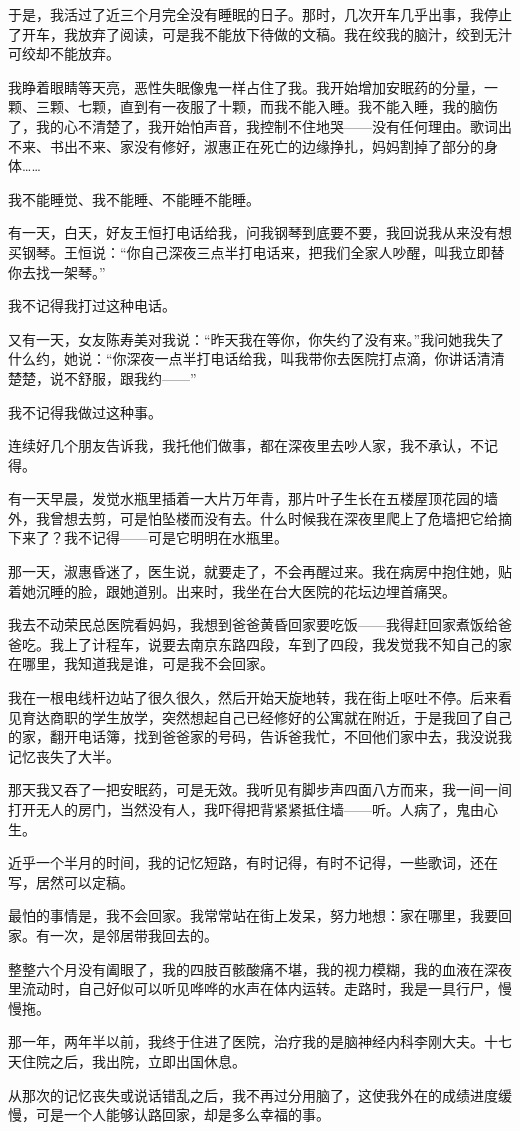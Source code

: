 \par 于是，我活过了近三个月完全没有睡眠的日子。那时，几次开车几乎出事，我停止了开车，我放弃了阅读，可是我不能放下待做的文稿。我在绞我的脑汁，绞到无汁可绞却不能放弃。
\par 我睁着眼睛等天亮，恶性失眠像鬼一样占住了我。我开始增加安眠药的分量，一颗、三颗、七颗，直到有一夜服了十颗，而我不能入睡。我不能入睡，我的脑伤了，我的心不清楚了，我开始怕声音，我控制不住地哭——没有任何理由。歌词出不来、书出不来、家没有修好，淑惠正在死亡的边缘挣扎，妈妈割掉了部分的身体……
\par 我不能睡觉、我不能睡、不能睡不能睡。
\par 有一天，白天，好友王恒打电话给我，问我钢琴到底要不要，我回说我从来没有想买钢琴。王恒说：“你自己深夜三点半打电话来，把我们全家人吵醒，叫我立即替你去找一架琴。”
\par 我不记得我打过这种电话。
\par 又有一天，女友陈寿美对我说：“昨天我在等你，你失约了没有来。”我问她我失了什么约，她说：“你深夜一点半打电话给我，叫我带你去医院打点滴，你讲话清清楚楚，说不舒服，跟我约——”
\par 我不记得我做过这种事。
\par 连续好几个朋友告诉我，我托他们做事，都在深夜里去吵人家，我不承认，不记得。
\par 有一天早晨，发觉水瓶里插着一大片万年青，那片叶子生长在五楼屋顶花园的墙外，我曾想去剪，可是怕坠楼而没有去。什么时候我在深夜里爬上了危墙把它给摘下来了？我不记得——可是它明明在水瓶里。
\par 那一天，淑惠昏迷了，医生说，就要走了，不会再醒过来。我在病房中抱住她，贴着她沉睡的脸，跟她道别。出来时，我坐在台大医院的花坛边埋首痛哭。
\par 我去不动荣民总医院看妈妈，我想到爸爸黄昏回家要吃饭——我得赶回家煮饭给爸爸吃。我上了计程车，说要去南京东路四段，车到了四段，我发觉我不知自己的家在哪里，我知道我是谁，可是我不会回家。
\par 我在一根电线杆边站了很久很久，然后开始天旋地转，我在街上呕吐不停。后来看见育达商职的学生放学，突然想起自己已经修好的公寓就在附近，于是我回了自己的家，翻开电话簿，找到爸爸家的号码，告诉爸我忙，不回他们家中去，我没说我记忆丧失了大半。
\par 那天我又吞了一把安眠药，可是无效。我听见有脚步声四面八方而来，我一间一间打开无人的房门，当然没有人，我吓得把背紧紧抵住墙——听。人病了，鬼由心生。
\par 近乎一个半月的时间，我的记忆短路，有时记得，有时不记得，一些歌词，还在写，居然可以定稿。
\par 最怕的事情是，我不会回家。我常常站在街上发呆，努力地想：家在哪里，我要回家。有一次，是邻居带我回去的。
\par 整整六个月没有阖眼了，我的四肢百骸酸痛不堪，我的视力模糊，我的血液在深夜里流动时，自己好似可以听见哗哗的水声在体内运转。走路时，我是一具行尸，慢慢拖。
\par 那一年，两年半以前，我终于住进了医院，治疗我的是脑神经内科李刚大夫。十七天住院之后，我出院，立即出国休息。
\par 从那次的记忆丧失或说话错乱之后，我不再过分用脑了，这使我外在的成绩进度缓慢，可是一个人能够认路回家，却是多么幸福的事。



